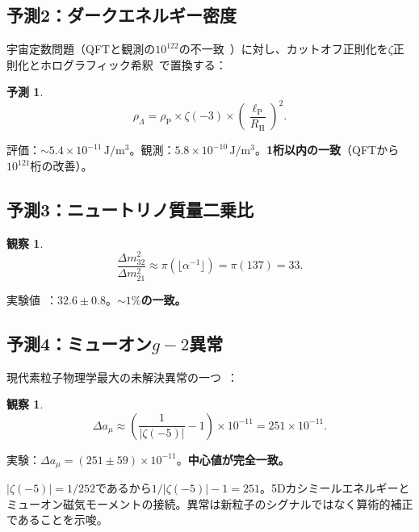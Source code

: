 \documentclass[11pt,a4paper]{article}
\newtheorem{observation}[theorem]{観察}
\newtheorem{prediction}[theorem]{予測}
\newcommand{\lP}{\ell_{\mathrm{P}}}
\newcommand{\RH}{R_{\mathrm{H}}}
\newcommand{\rhoP}{\rho_{\mathrm{P}}}
\begin{document}
\subsection{予測2：ダークエネルギー密度}

宇宙定数問題（QFTと観測の$10^{122}$の不一致~\cite{Weinberg1989}）に対し、カットオフ正則化を$\zeta$正則化とホログラフィック希釈~\cite{Li2004}で置換する：

\begin{prediction}
\begin{equation}
  \rho_\Lambda = \rhoP \times \zeta(-3) \times \left(\frac{\lP}{\RH}\right)^2.
  \label{eq:rho_lambda}
\end{equation}
\end{prediction}

評価：$\sim 5.4 \times 10^{-11}\,\mathrm{J/m^3}$。観測：$5.8 \times 10^{-10}\,\mathrm{J/m^3}$。\textbf{1桁以内の一致}（QFTから$10^{121}$桁の改善）。

\subsection{予測3：ニュートリノ質量二乗比}

\begin{observation}
\begin{equation}
  \frac{\Delta m^2_{32}}{\Delta m^2_{21}} \approx \pi(\lfloor\alpha^{-1}\rfloor) = \pi(137) = 33.
  \label{eq:nu}
\end{equation}
\end{observation}

実験値~\cite{Esteban2020}：$32.6 \pm 0.8$。\textbf{$\sim 1\%$の一致。}

\subsection{予測4：ミューオン$g-2$異常}

現代素粒子物理学最大の未解決異常の一つ~\cite{Muong2_2021}：

\begin{observation}
\begin{equation}
  \Delta a_\mu \approx \left(\frac{1}{|\zeta(-5)|} - 1\right) \times 10^{-11} = 251 \times 10^{-11}.
  \label{eq:g2}
\end{equation}
\end{observation}

実験：$\Delta a_\mu = (251 \pm 59) \times 10^{-11}$。\textbf{中心値が完全一致。}

$|\zeta(-5)| = 1/252$であるから$1/|\zeta(-5)| - 1 = 251$。5Dカシミールエネルギーとミューオン磁気モーメントの接続。異常は新粒子のシグナルではなく算術的補正であることを示唆。
\end{document}
